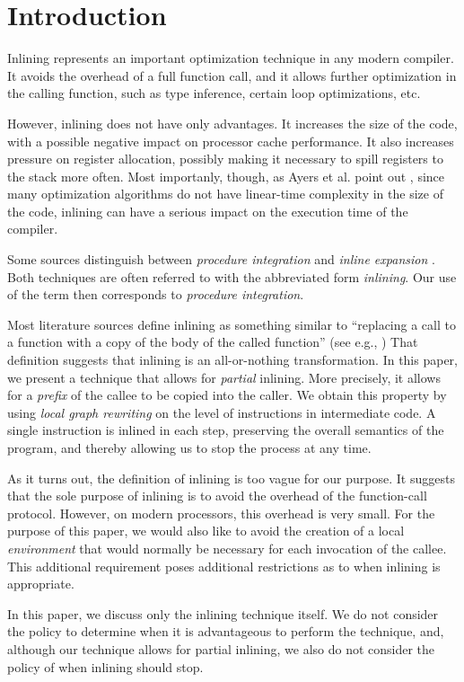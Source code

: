 \section{Introduction}

Inlining represents an important optimization technique in any modern
compiler.  It avoids the overhead of a full function call, and it
allows further optimization in the calling function, such as type
inference, certain loop optimizations, etc.

However, inlining does not have only advantages.  It increases the
size of the code, with a possible negative impact on processor cache
performance.  It also increases pressure on register allocation,
possibly making it necessary to spill registers to the stack more
often.  Most importanly, though, as Ayers et al. point out
\cite{Ayers:1997:AI:258915.258928, Ayers:1997:AI:258916.258928}, since
many optimization algorithms do not have linear-time complexity in the
size of the code, inlining can have a serious impact on the execution
time of the compiler.

Some sources distinguish between \emph{procedure integration} and
\emph{inline expansion} \cite{Muchnick:1998:ACD:286076}.  Both
techniques are often referred to with the abbreviated form
\emph{inlining}.  Our use of the term then corresponds to
\emph{procedure integration}.

Most literature sources define inlining as something similar to
``replacing a call to a function with a copy of the body of the called
function'' (see e.g.,
\cite{Chang:1989:IFE:74818.74840,Chang:1989:IFE:73141.74840,
  Scheifler:1977:AIS:359810.359830}) That definition suggests that
inlining is an all-or-nothing transformation.  In this paper, we
present a technique that allows for \emph{partial} inlining.  More
precisely, it allows for a \emph{prefix} of the callee to be copied
into the caller.  We obtain this property by using \emph{local graph
  rewriting} on the level of instructions in intermediate code.  A
single instruction is inlined in each step, preserving the overall
semantics of the program, and thereby allowing us to stop the process
at any time.

As it turns out, the definition of inlining is too vague for our
purpose.  It suggests that the sole purpose of inlining is to avoid
the overhead of the function-call protocol.  However, on modern
processors, this overhead is very small.  For the purpose of this
paper, we would also like to avoid the creation of a local
\emph{environment} that would normally be necessary for each
invocation of the callee.  This additional requirement poses
additional restrictions as to when inlining is appropriate.

In this paper, we discuss only the inlining technique itself.  We do
not consider the policy to determine when it is advantageous to
perform the technique, and, although our technique allows for partial
inlining, we also do not consider the policy of when inlining should
stop.

